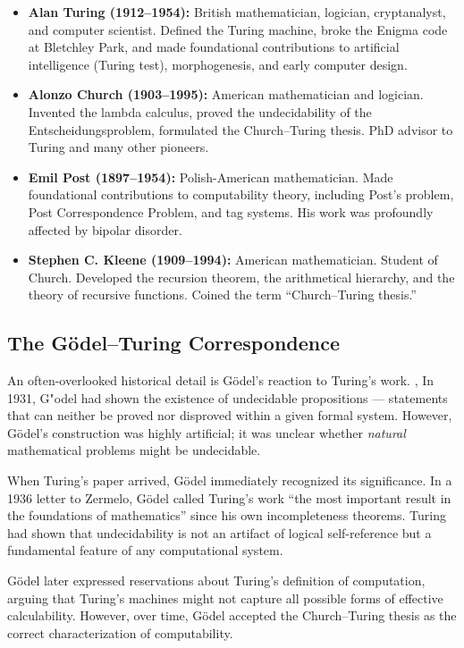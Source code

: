 \begin{itemize}
\item \textbf{Alan Turing (1912--1954):} British mathematician, logician, cryptanalyst, and computer scientist. Defined the Turing machine, broke the Enigma code at Bletchley Park, and made foundational contributions to artificial intelligence (Turing test), morphogenesis, and early computer design.

\item \textbf{Alonzo Church (1903--1995):} American mathematician and logician. Invented the lambda calculus, proved the undecidability of the Entscheidungsproblem, formulated the Church--Turing thesis. PhD advisor to Turing and many other pioneers.

\item \textbf{Emil Post (1897--1954):} Polish-American mathematician. Made foundational contributions to computability theory, including Post's problem, Post Correspondence Problem, and tag systems. His work was profoundly affected by bipolar disorder.

\item \textbf{Stephen C. Kleene (1909--1994):} American mathematician. Student of Church. Developed the recursion theorem, the arithmetical hierarchy, and the theory of recursive functions. Coined the term ``Church--Turing thesis.''
\end{itemize}

\subsection*{The G\"odel--Turing Correspondence}

An often-overlooked historical detail is G\"odel's reaction to Turing's work. \cite{godel1931}, In 1931, G{"o}del had shown the existence of undecidable propositions — statements that can neither be proved nor disproved within a given formal system. However, G\"odel's construction was highly artificial; it was unclear whether \emph{natural} mathematical problems might be undecidable.

When Turing's paper arrived, G\"odel immediately recognized its significance. In a 1936 letter to Zermelo, G\"odel called Turing's work ``the most important result in the foundations of mathematics'' since his own incompleteness theorems. Turing had shown that undecidability is not an artifact of logical self-reference but a fundamental feature of any computational system.

G\"odel later expressed reservations about Turing's definition of computation, arguing that Turing's machines might not capture all possible forms of effective calculability. However, over time, G\"odel accepted the Church--Turing thesis as the correct characterization of computability.

